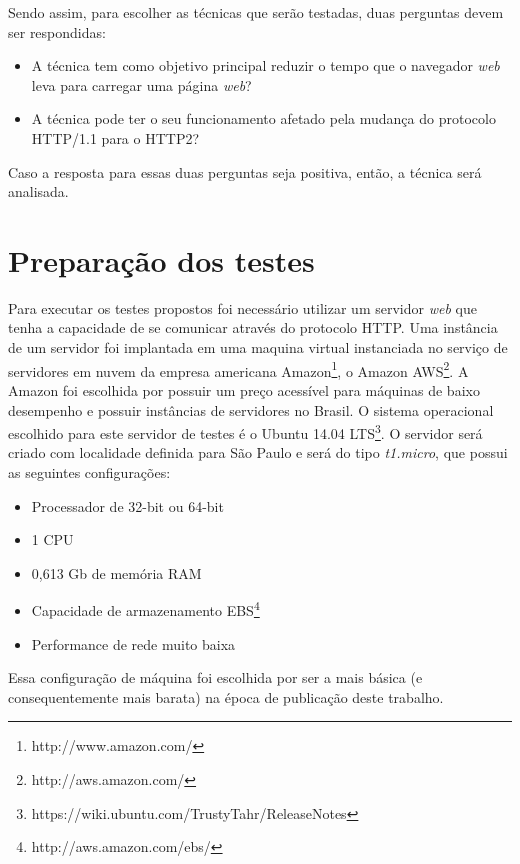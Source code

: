 Sendo assim, para escolher as técnicas que serão testadas, duas perguntas devem ser respondidas:

\begin{itemize}
	\item A técnica tem como objetivo principal reduzir o tempo que o navegador \textit{web} leva para carregar uma página \textit{web}?
	\item A técnica pode ter o seu funcionamento afetado pela mudança do protocolo HTTP/1.1 para o HTTP2?
\end{itemize}

Caso a resposta para essas duas perguntas seja positiva, então, a técnica será analisada.

\section{Preparação dos testes}
\label{sec:preparacaodostestes}

Para executar os testes propostos foi necessário utilizar um servidor \textit{web} que tenha a capacidade de se comunicar através do protocolo HTTP. Uma instância de um servidor foi implantada em uma maquina virtual instanciada no serviço de servidores em nuvem da empresa americana Amazon\footnote{http://www.amazon.com/}, o Amazon AWS\footnote{http://aws.amazon.com/}. A Amazon foi escolhida por possuir um preço acessível para máquinas de baixo desempenho e possuir instâncias de servidores no Brasil. O sistema operacional escolhido para este servidor de testes é o Ubuntu 14.04 LTS\footnote{https://wiki.ubuntu.com/TrustyTahr/ReleaseNotes}. O servidor será criado com localidade definida para São Paulo e será do tipo \textit{t1.micro}, que possui as seguintes configurações:

\begin{itemize}
	\item Processador de 32-bit ou 64-bit
	\item 1 CPU
	\item 0,613 Gb de memória RAM
	\item Capacidade de armazenamento EBS\footnote{http://aws.amazon.com/ebs/}
	\item Performance de rede muito baixa
\end{itemize}

Essa configuração de máquina foi escolhida por ser a mais básica (e consequentemente mais barata) na época de publicação deste trabalho.

